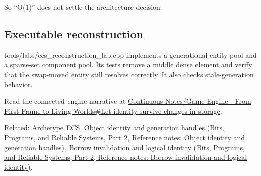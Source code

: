 So ``O(1)'' does not settle the architecture decision.

\subsection{Executable reconstruction}\label{appendix-8404d0b1a3e7-executable-reconstruction}

\hypertarget{appendix-8404d0b1a3e7-executable-reconstruction}{}

tools/labs/ecs\_reconstruction\_lab.cpp implements a generational entity pool and a sparse-set component pool. Its tests remove a middle dense element and verify that the swap-moved entity still resolves correctly. It also checks stale-generation behavior.

Read the connected engine narrative at \hyperref[05-engine-i-ch014-let-identity-survive-changes-in-storage]{Continuous Notes/Game Engine - From First Frame to Living Worlds\#Let identity survive changes in storage}.

Related: \hyperref[appendix-fbfeb0430008]{Archetype ECS}, \href{../01-Bits-Programs-and-Reliable-Systems-P02/main.pdf\#appendix-f1581457d322}{Object identity and generation handles (Bits, Programs, and Reliable Systems, Part 2, Reference notes: Object identity and generation handles)}, \href{../01-Bits-Programs-and-Reliable-Systems-P02/main.pdf\#appendix-f9b8b9188c7f}{Borrow invalidation and logical identity (Bits, Programs, and Reliable Systems, Part 2, Reference notes: Borrow invalidation and logical identity)}.
